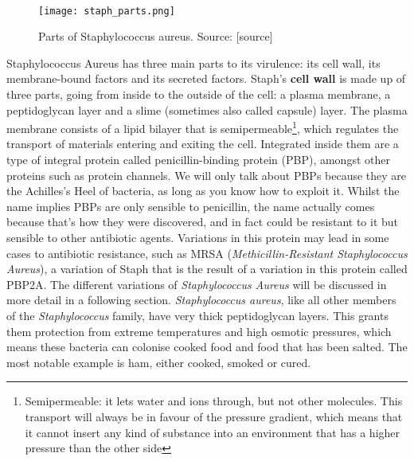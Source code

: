 \paragraph{}
\begin{wrapfigure}{r}{0.5\textwidth}\begin{center}\texttt{[image: staph\_parts.png]}\end{center}\caption{Parts of Staphylococcus aureus. Source: [source]}\end{wrapfigure}
Staphylococcus Aureus has three main parts to its virulence: its cell wall, its membrane-bound factors and its secreted factors. Staph's \textbf{cell wall} is made up of three parts, going from inside to the outside of the cell: a plasma membrane, a peptidoglycan layer and a slime (sometimes also called capsule) layer.\newline %
The plasma membrane consists of a lipid bilayer that is semipermeable\footnote{Semipermeable: it lets water and ions through, but not other molecules. This transport will always be in favour of the pressure gradient, which means that it cannot insert any kind of substance into an environment that has a higher pressure than the other side}, which regulates the transport of materials entering and exiting the cell. Integrated inside them are a type of integral protein called penicillin-binding protein (PBP), amongst other  proteins such as protein channels. We will only talk about PBPs because they are the Achilles's Heel of bacteria, as long as you know how to exploit it. Whilst the name implies PBPs are only sensible to penicillin, the name actually comes because that's how they were discovered, and in fact could be resistant to it but sensible to other antibiotic agents. Variations in this protein may lead in some cases to antibiotic resistance, such as MRSA (\emph{Methicillin-Resistant Staphylococcus Aureus}), a variation of Staph that is the result of a variation in this protein called PBP2A. The different variations of \emph{Staphylococcus Aureus} will be discussed in more detail in a following section. \newline
\emph{Staphylococcus aureus}, like all other members of the \emph{Staphylococcus} family, have very thick peptidoglycan layers. This grants them protection from extreme temperatures and high osmotic pressures, which means these bacteria can colonise cooked food and food that has been salted. The most notable example is ham, either cooked, smoked or cured.
